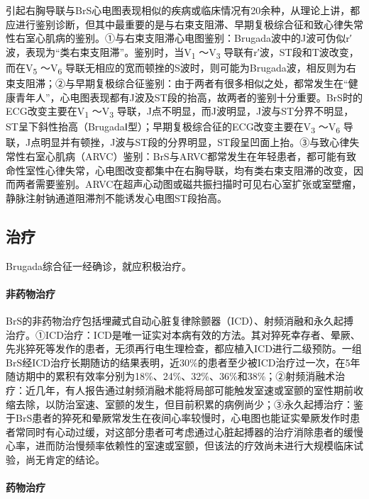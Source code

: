 引起右胸导联与BrS心电图表现相似的疾病或临床情况有20余种，从理论上讲，都应进行鉴别诊断，但其中最重要的是与右束支阻滞、早期复极综合征和致心律失常性右室心肌病的鉴别。①与右束支阻滞心电图鉴别：Brugada波中的J波可伪似r′波，表现为“类右束支阻滞”。鉴别时，当V\textsubscript{1}
～V\textsubscript{3} 导联有r′波，ST段和T波改变，而在V\textsubscript{5}
～V\textsubscript{6}
导联无相应的宽而顿挫的S波时，则可能为Brugada波，相反则为右束支阻滞；②与早期复极综合征鉴别：由于两者有很多相似之处，都常发生在“健康青年人”，心电图表现都有J波及ST段的抬高，故两者的鉴别十分重要。BrS时的ECG改变主要在V\textsubscript{1}
～V\textsubscript{3}
导联，J点不明显，而J波明显，J波与ST分界不明显，ST呈下斜性抬高（BrugadaⅠ型）；早期复极综合征的ECG改变主要在V\textsubscript{3}
～V\textsubscript{6}
导联，J点明显并有顿挫，J波与ST段的分界明显，ST段呈凹面上抬。③与致心律失常性右室心肌病（ARVC）鉴别：BrS与ARVC都常发生在年轻患者，都可能有致命性室性心律失常，心电图改变都集中在右胸导联，均有类右束支阻滞的改变，因而两者需要鉴别。ARVC在超声心动图或磁共振扫描时可见右心室扩张或室壁瘤，静脉注射钠通道阻滞剂不能诱发心电图ST段抬高。

\subsection{治疗}

Brugada综合征一经确诊，就应积极治疗。

\paragraph{非药物治疗}

BrS的非药物治疗包括埋藏式自动心脏复律除颤器（ICD）、射频消融和永久起搏治疗。①ICD治疗：ICD是唯一证实对本病有效的方法。其对猝死幸存者、晕厥、先兆猝死等发作的患者，无须再行电生理检查，都应植入ICD进行二级预防。一组BrS经ICD治疗长期随访的结果表明，近30\%的患者至少被ICD治疗过一次，在5年随访期中的累积有效率分别为18\%、24\%、32\%、36\%和38\%；②射频消融术治疗：近几年，有人报告通过射频消融术能将局部可能触发室速或室颤的室性期前收缩去除，以防治室速、室颤的发生，但目前积累的病例尚少；③永久起搏治疗：鉴于BrS患者的猝死和晕厥常发生在夜间心率较慢时，心电图也能证实晕厥发作时患者常同时有心动过缓，对这部分患者可考虑通过心脏起搏器的治疗消除患者的缓慢心率，进而防治慢频率依赖性的室速或室颤，但该法的疗效尚未进行大规模临床试验，尚无肯定的结论。

\paragraph{药物治疗}

